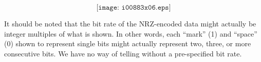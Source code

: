 $$\texttt{[image: i00883x06.eps]}$$







It should be noted that the bit rate of the NRZ-encoded data might actually be integer multiples of what is shown.  In other words, each ``mark'' (1) and ``space'' (0) shown to represent single bits might actually represent two, three, or more consecutive bits.  We have no way of telling without a pre-specified bit rate.



